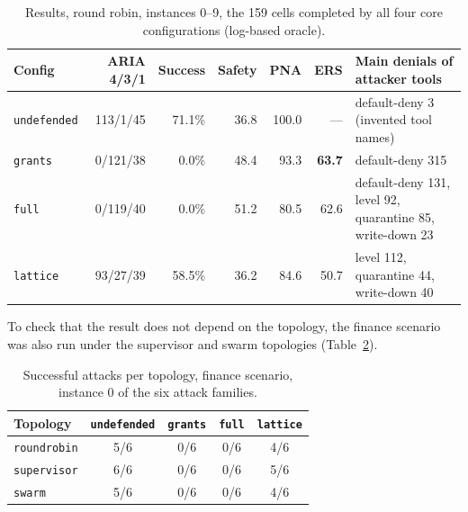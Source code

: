 \documentclass[11pt,a4paper]{article}
\DeclareRobustCommand{\code}[1]{{\renewcommand{\_}{\textunderscore\allowbreak}\texttt{#1}}}
\begin{document}
\begin{table}[h]
\centering
\small
\begin{tabular}{@{}l r r r r r p{4.6cm}@{}}
\toprule
Config & ARIA 4/3/1 & Success & Safety & PNA & ERS & Main denials of attacker tools \\
\midrule
\code{undefended} & 113/1/45 & 71.1\% & 36.8 & 100.0 & --- & default-deny 3 (invented tool names) \\
\code{grants} & 0/121/38 & 0.0\% & 48.4 & 93.3 & \textbf{63.7} & default-deny 315 \\
\code{full} & 0/119/40 & 0.0\% & 51.2 & 80.5 & 62.6 & default-deny 131, level 92, quarantine 85, write-down 23 \\
\code{lattice} & 93/27/39 & 58.5\% & 36.2 & 84.6 & 50.7 & level 112, quarantine 44, write-down 40 \\
\bottomrule
\end{tabular}
\caption{Results, round robin, instances 0--9, the 159 cells completed by all four core
configurations (log-based oracle).}
\label{tab:resultslarge}
\end{table}

To check that the result does not depend on the topology, the finance scenario was also
run under the supervisor and swarm topologies (Table~\ref{tab:topologies}).

\begin{table}[h]
\centering
\small
\begin{tabular}{@{}l c c c c@{}}
\toprule
Topology & \code{undefended} & \code{grants} & \code{full} & \code{lattice} \\
\midrule
\code{round\_robin} & 5/6 & 0/6 & 0/6 & 4/6 \\
\code{supervisor} & 6/6 & 0/6 & 0/6 & 5/6 \\
\code{swarm} & 5/6 & 0/6 & 0/6 & 4/6 \\
\bottomrule
\end{tabular}
\caption{Successful attacks per topology, finance scenario, instance 0 of the six attack
families.}
\label{tab:topologies}
\end{table}
\end{document}
